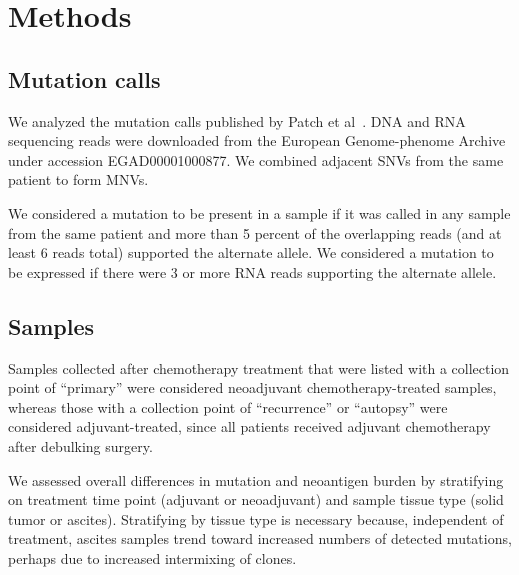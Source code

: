 \section*{Methods}

\subsection*{Mutation calls}
We analyzed the mutation calls published by Patch et al~\cite{Patch_2015}. DNA and RNA sequencing reads were downloaded from the European Genome-phenome Archive under accession EGAD00001000877. We combined adjacent SNVs from the same patient to form MNVs.


We considered a mutation to be present in a sample if it was called in any sample from the same patient and more than 5 percent of the overlapping reads (and at least 6 reads total) supported the alternate allele. We considered a mutation to be expressed if there were 3 or more RNA reads supporting the alternate allele.

\subsection*{Samples}
Samples collected after chemotherapy treatment that were listed with a collection point of ``primary'' were considered neoadjuvant chemotherapy-treated samples, whereas those with a collection point of ``recurrence'' or ``autopsy'' were considered adjuvant-treated, since all patients received adjuvant chemotherapy after debulking surgery.

We assessed overall differences in mutation and neoantigen burden by stratifying on treatment time point (adjuvant or neoadjuvant) and sample tissue type (solid tumor or ascites). Stratifying by tissue type is necessary because, independent of treatment, ascites samples trend toward increased numbers of detected mutations, perhaps due to increased intermixing of clones.



